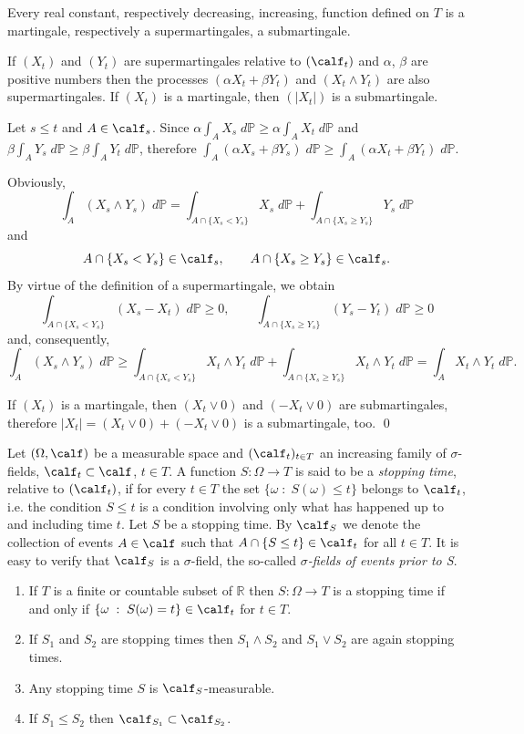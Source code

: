 \documentclass[preprint]{imsart}
\def\P{\mathbb P}
\def\R{\mathbb R}
\begin{document}
{Every real constant, respectively decreasing, increasing, function
defined on $T$ is a martingale, respectively a supermartingales, a
submartingale.

\begin{Lemma}\label{martbananli}
  If $(X_t)$ and $(Y_t)$  are supermartingales relative to
  $(\calf_t)$ and $\alpha$, $\beta$ are positive numbers then the
  processes $(\alpha X_t+\beta Y_t)$  and $(X_t\wedge Y_t)$   are
  also supermartingales. If $(X_t)$ is a martingale, then
  $(|X_t|)$ is a submartingale.
\end{Lemma}

 Let $s\leq t$ and $A\in\calf_s$.
Since $\alpha \int_A X_s\; d\P\ge \alpha \int_A X_t\; d\P$ and
$\beta \int_A Y_s\; d\P\ge \beta \int_A Y_t\; d\P$, therefore
$\int_A(\alpha  X_s+\beta Y_s)\; d\P\ge
 \int_A (\alpha X_t+\beta Y_t)\; d\P$.

 Obviously,
$$
\int_A(  X_s\wedge Y_s)\; d\P=
\int_{A\cap \{X_s<Y_s\}}X_s\; d\P+
\int_{A\cap \{X_s\ge Y_s\}}Y_s\; d\P
$$
and
$$
{A\cap \{X_s<Y_s\}}\in \calf_s,\qquad
{A\cap \{X_s\ge Y_s\}}\in \calf_s.
$$
By virtue of the definition of a supermartingale, we obtain
$$
\int_{A\cap \{X_s<Y_s\}}(X_s-X_t)\; d\P\ge 0,\qquad
\int_{A\cap \{X_s\ge Y_s\}}(Y_s-Y_t)\; d\P\ge 0
$$
and, consequently,
$$
\int_A(  X_s\wedge Y_s)\; d\P\ge
\int_{A\cap \{X_s<Y_s\}}X_t\wedge Y_t\; d\P+
\int_{A\cap \{X_s\ge Y_s\}}X_t\wedge Y_t\; d\P=
\int_{A}X_t\wedge Y_t\; d\P.
$$

If $(X_t)$ is a martingale, then $(X_t\vee 0)$ and $(-X_t\vee 0)$
are submartingales, therefore $|X_t| =
(X_t\vee 0)+(-X_t\vee 0)$ is a submartingale, too.
\qed


Let $(\Omega, \calf)$ be a measurable space and $(\calf_t)_{t\in
T}$ an increasing family of $\sigma$-fields, $\calf_t\subset
\calf$, $t\in T$. A function $S:\Omega\to T$ is said to be a {\em
stopping time}, relative to $(\calf_t)$, if for every $t\in T$ the
set $\{\omega\; :\; S(\omega)\leq t\}$ belongs to $\calf_t$, i.e.
the condition $S\le  t$ is a condition involving only what has
happened up to and including time $t$. Let $S$ be a stopping
time. By $\calf_S$ we denote the collection of events $A\in\calf$
such that $A\cap \{S\leq t\}\in \calf_t$ for all $t\in T$. It is
easy to verify that $\calf_S$ is a $\sigma$-field, the so-called
{\em $\sigma$-fields of events prior to S}.

\begin{Proposition}\label{elemstoptimes}
  \begin{enumerate}
  \item[a)] If $T$ is a finite or countable subset of $\R$ then
  $S:\Omega\to T$ is a stopping time if and only if
  $\{\omega\; :\; S(\omega)= t\}\in\calf_t$ for $t\in T$.
    \item[b)] If $S_1$ and $S_2$ are stopping times then
    $S_1\wedge S_2$ and     $S_1\vee S_2$ are again stopping
    times.
      \item[c)] Any stopping time $S$ is $\calf_S$-measurable.
    \item[d)]  If  $S_1\le S_2$ then  $\calf_{S_1}\subset
    \calf_{S_2}$.
    \end{enumerate}
\end{Proposition}

}
\end{document}
